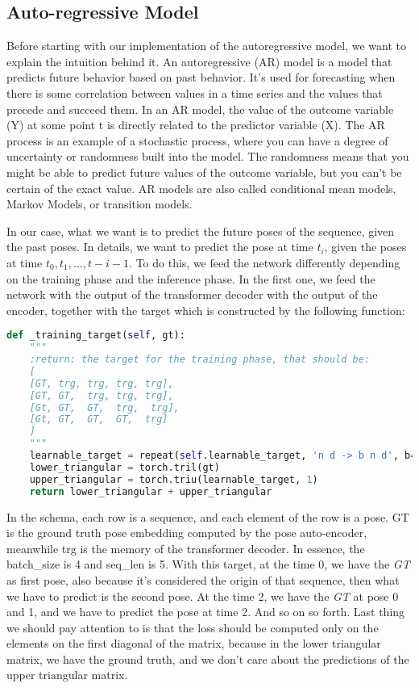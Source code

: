 \subsection{Auto-regressive Model}\label{subsec:auto-regressive-model}
Before starting with our implementation of the autoregressive model, we want to explain the intuition behind it.
An autoregressive (AR) model is a model that predicts future behavior based on past behavior.
It's used for forecasting when there is some correlation between values in a time series and the values that precede and succeed them.
In an AR model, the value of the outcome variable (Y) at some point t is directly related to the predictor variable (X).
The AR process is an example of a stochastic process, where you can have a degree of uncertainty or randomness built into the model.
The randomness means that you might be able to predict future values of the outcome variable, but you can't be certain of the exact value.
AR models are also called conditional mean models, Markov Models, or transition models.

In our case, what we want is to predict the future poses of the sequence, given the past poses.
In details, we want to predict the pose at time $t_i$, given the poses at time $t_0, t_1, \dots, t-i-1$.
To do this, we feed the network differently depending on the training phase and the inference phase.
In the first one, we feed the network with the output of the transformer decoder with the output of the encoder, together with the target which is constructed by the following function:
\begin{lstlisting}[captionpos=b, label={lst:lst-training-target}, caption={Training target}, language=Python]
def _training_target(self, gt):
    """
    :return: the target for the training phase, that should be:
    [
    [GT, trg, trg, trg, trg],
    [GT, GT,  trg, trg, trg],
    [Gt, GT,  GT,  trg,  trg],
    [Gt, GT,  GT,  GT,  trg]
    ]
    """
    learnable_target = repeat(self.learnable_target, 'n d -> b n d', b=gt.shape[0])
    lower_triangular = torch.tril(gt)
    upper_triangular = torch.triu(learnable_target, 1)
    return lower_triangular + upper_triangular
\end{lstlisting}
In the schema, each row is a sequence, and each element of the row is a pose.
GT is the ground truth pose embedding computed by the pose auto-encoder, meanwhile trg is the memory of the transformer decoder.
In essence, the batch\_size is 4 and seq\_len is 5.
With this target, at the time 0, we have the \textit{GT} as first pose, also because it's considered the origin of that sequence, then what we have to predict is the second pose.
At the time 2, we have the \textit{GT} at pose 0 and 1, and we have to predict the pose at time 2.
And so on so forth.
Last thing we should pay attention to is that the loss should be computed only on the elements on the first diagonal of the matrix, because in the lower triangular matrix, we have the ground truth, and we don't care about the predictions of the upper triangular matrix.

